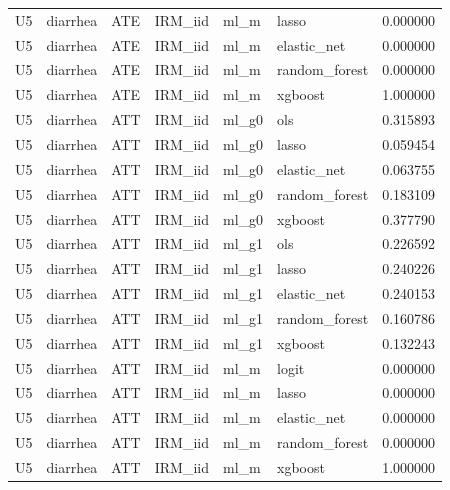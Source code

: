 \begin{longtable}{llllllr}
U5 & diarrhea & ATE & IRM\_iid & ml\_m & lasso & 0.000000 \\
U5 & diarrhea & ATE & IRM\_iid & ml\_m & elastic\_net & 0.000000 \\
U5 & diarrhea & ATE & IRM\_iid & ml\_m & random\_forest & 0.000000 \\
U5 & diarrhea & ATE & IRM\_iid & ml\_m & xgboost & 1.000000 \\
U5 & diarrhea & ATT & IRM\_iid & ml\_g0 & ols & 0.315893 \\
U5 & diarrhea & ATT & IRM\_iid & ml\_g0 & lasso & 0.059454 \\
U5 & diarrhea & ATT & IRM\_iid & ml\_g0 & elastic\_net & 0.063755 \\
U5 & diarrhea & ATT & IRM\_iid & ml\_g0 & random\_forest & 0.183109 \\
U5 & diarrhea & ATT & IRM\_iid & ml\_g0 & xgboost & 0.377790 \\
U5 & diarrhea & ATT & IRM\_iid & ml\_g1 & ols & 0.226592 \\
U5 & diarrhea & ATT & IRM\_iid & ml\_g1 & lasso & 0.240226 \\
U5 & diarrhea & ATT & IRM\_iid & ml\_g1 & elastic\_net & 0.240153 \\
U5 & diarrhea & ATT & IRM\_iid & ml\_g1 & random\_forest & 0.160786 \\
U5 & diarrhea & ATT & IRM\_iid & ml\_g1 & xgboost & 0.132243 \\
U5 & diarrhea & ATT & IRM\_iid & ml\_m & logit & 0.000000 \\
U5 & diarrhea & ATT & IRM\_iid & ml\_m & lasso & 0.000000 \\
U5 & diarrhea & ATT & IRM\_iid & ml\_m & elastic\_net & 0.000000 \\
U5 & diarrhea & ATT & IRM\_iid & ml\_m & random\_forest & 0.000000 \\
U5 & diarrhea & ATT & IRM\_iid & ml\_m & xgboost & 1.000000 \\
\end{longtable}
